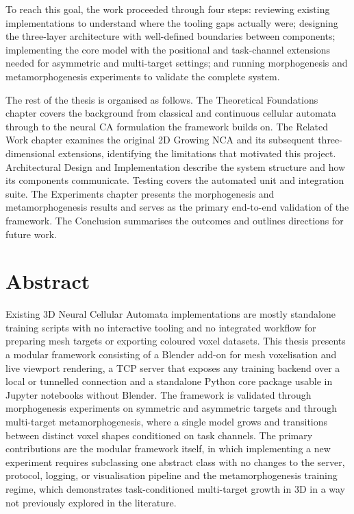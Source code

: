 To reach this goal, the work proceeded through four steps: reviewing existing
implementations to understand where the tooling gaps actually were; designing the
three-layer architecture with well-defined boundaries between components; implementing
the core model with the positional and task-channel extensions needed for asymmetric
and multi-target settings; and running morphogenesis and metamorphogenesis experiments
to validate the complete system.

The rest of the thesis is organised as follows. The Theoretical Foundations chapter
covers the background from classical and continuous cellular automata through to the
neural CA formulation the framework builds on. The Related Work chapter examines the
original 2D Growing NCA and its subsequent three-dimensional extensions, identifying
the limitations that motivated this project. Architectural Design and Implementation
describe the system structure and how its components communicate. Testing covers the
automated unit and integration suite. The Experiments chapter presents the
morphogenesis and metamorphogenesis results and serves as the primary end-to-end
validation of the framework. The Conclusion summarises the outcomes and outlines
directions for future work.

\chapter{Abstract}
\label{abstrakt}

Existing 3D Neural Cellular Automata implementations are mostly standalone training scripts
with no interactive tooling and no integrated workflow for preparing mesh targets or
exporting coloured voxel datasets. This thesis presents a modular framework consisting
of a Blender add-on for mesh voxelisation and live viewport rendering, a TCP server
that exposes any training backend over a local or tunnelled connection and a
standalone Python core package usable in Jupyter notebooks without Blender. The
framework is validated through morphogenesis experiments on symmetric and asymmetric
targets and through multi-target metamorphogenesis, where a single model grows and
transitions between distinct voxel shapes conditioned on task channels. The primary
contributions are the modular framework itself, in which implementing a new experiment
requires subclassing one abstract class with no changes to the server, protocol,
logging, or visualisation pipeline and the metamorphogenesis training regime, which
demonstrates task-conditioned multi-target growth in 3D in a way not previously
explored in the literature.

